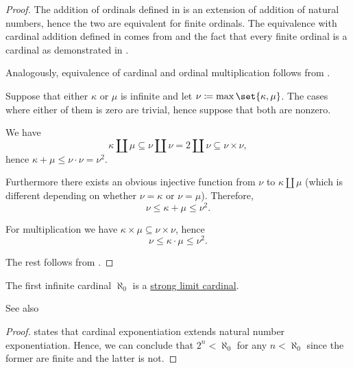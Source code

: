 \begin{proof}
   The addition of ordinals defined in  is an extension of addition of natural numbers, hence the two are equivalent for finite ordinals. The equivalence with cardinal addition defined in  comes from  and the fact that every finite ordinal is a cardinal as demonstrated in .

  Analogously, equivalence of cardinal and ordinal multiplication follows from .

   Suppose that either \( \kappa \) or \( \mu \) is infinite and let \( \nu \coloneqq \max\set{ \kappa, \mu } \). The cases where either of them is zero are trivial, hence suppose that both are nonzero.

  We have
  \begin{equation*}
    \kappa \amalg \mu \subseteq \nu \amalg \nu = 2 \amalg \nu \subseteq \nu \times \nu,
  \end{equation*}
  hence \( \kappa + \mu \leq \nu \cdot \nu = \nu^2 \).

  Furthermore there exists an obvious injective function from \( \nu \) to \( \kappa \amalg \mu \) (which is different depending on whether \( \nu = \kappa \) or \( \nu = \mu \)). Therefore,
  \begin{equation*}
    \nu \leq \kappa + \mu \leq \nu^2.
  \end{equation*}

  For multiplication we have \( \kappa \times \mu \subseteq \nu \times \nu \), hence
  \begin{equation*}
    \nu \leq \kappa \cdot \mu \leq \nu^2.
  \end{equation*}

  The rest follows from .
\end{proof}

\begin{corollary}\label{thm:aleph_zero_is_strong_limit}
  The first infinite cardinal \( \aleph_0 \) is a \hyperref[def:successor_and_limit_cardinal/strong_limit]{strong limit cardinal}.

  See also 
\end{corollary}
\begin{proof}
   states that cardinal exponentiation extends natural number exponentiation. Hence, we can conclude that \( 2^n < \aleph_0 \) for any \( n < \aleph_0 \) since the former are finite and the latter is not.
\end{proof}


